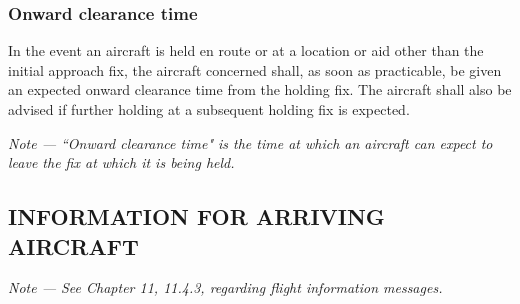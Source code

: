 \documentclass[../main.tex]{subfiles}
\begin{document}
    \subsubsection{Onward clearance time} \label{6.5.8}

    In the event an aircraft is held en route or at a location or aid other than the initial approach fix, the aircraft concerned shall, as soon as practicable, be given an expected onward clearance time from the holding fix. The aircraft shall also be advised if further holding at a subsequent holding fix is expected.

    \textit{Note --- ``Onward clearance time" is the time at which an aircraft can expect to leave the fix at which it is being held.}

    \subsection[Information for arriving aircraft]{INFORMATION FOR ARRIVING AIRCRAFT}

    \begin{enumempty}[labelindent=\parindent]
        \item \textit{Note --- See Chapter 11, 11.4.3, regarding flight information messages.}
    \end{enumempty}
\end{document}
